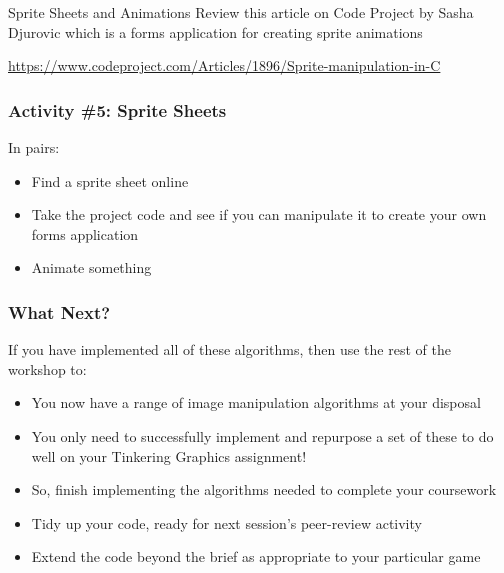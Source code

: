 \begin{frame}{Sprite Sheets and Animations}
	Review this article on Code Project by Sasha Djurovic which is a forms application for creating sprite animations 
	
	\vspace{2em}
	
	\url{https://www.codeproject.com/Articles/1896/Sprite-manipulation-in-C}
	
\end{frame}

\begin{frame}
	\frametitle{Activity \#5: Sprite Sheets}
	
	In pairs:
	
	\vspace{2em}
	
	\begin{itemize}		
		\item Find a sprite sheet online
		\item Take the project code and see if you can manipulate it to create your own forms application
		\item Animate something
	\end{itemize}
\end{frame}

\begin{frame}
	\frametitle{What Next?}
	
	If you have implemented all of these algorithms, then use the rest of the workshop to:
	
	\vspace{2em}
	
	\begin{itemize}	
		\item You now have a range of image manipulation algorithms at your disposal
		\item You only need to successfully implement and repurpose a set of these to do well on your Tinkering Graphics assignment!
		\item So, finish implementing the algorithms needed to complete your coursework
		\item Tidy up your code, ready for next session's peer-review activity
		\item Extend the code beyond the brief as appropriate to your particular game
	\end{itemize}
\end{frame}


